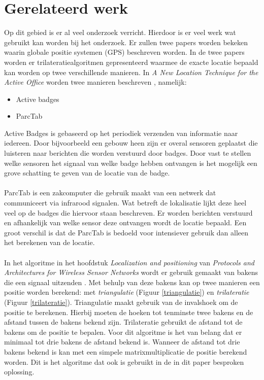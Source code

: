 \documentclass{article}
\begin{document}
\section{Gerelateerd werk}
Op dit gebied is er al veel onderzoek verricht. Hierdoor is er veel werk wat gebruikt kan worden bij het onderzoek. Er zullen twee papers worden bekeken waarin globale positie systemen (GPS) beschreven worden. In de twee papers worden er trilateratiealgoritmen gepresenteerd waarmee de exacte locatie bepaald kan worden op twee verschillende manieren. In \textit{A New Location Technique for the Active Office} worden twee manieren beschreven \cite{ward97}, namelijk:
\begin{itemize}
	\item Active badges
	\item ParcTab
\end{itemize}
Active Badges is gebaseerd op het periodiek verzenden van informatie naar iedereen. Door bijvoorbeeld een gebouw heen zijn er overal sensoren geplaatst die luisteren naar berichten die worden verstuurd door badges. Door vast te stellen welke sensoren het signaal van welke badge hebben ontvangen is het mogelijk een grove schatting te geven van de locatie van de badge.\\
\\
ParcTab is een zakcomputer die gebruik maakt van een netwerk dat communiceert via infrarood signalen. Wat betreft de lokalisatie lijkt deze heel veel op de badges die hiervoor staan beschreven. Er worden berichten verstuurd en afhankelijk van welke sensor deze ontvangen wordt de locatie bepaald. Een groot verschil is dat de ParcTab is bedoeld voor intensiever gebruik dan alleen het berekenen van de locatie. \\
\\
In het algoritme in het hoofdstuk \textit{Localization and positioning} van \textit{Protocols and Architectures for Wireless Sensor Networks} wordt er gebruik gemaakt van bakens die een signaal uitzenden \cite{h9}. Met behulp van deze bakens kan op twee manieren een positie worden berekend: met \emph{triangulatie} (Figuur \ref{triangulatie}) en \emph{trilateratie} (Figuur \ref{trilateratie}). Triangulatie maakt gebruik van de invalshoek om de positie te berekenen. Hierbij moeten de hoeken tot tenminste twee bakens en de afstand tussen de bakens bekend zijn. Trilateratie gebruikt de afstand tot de bakens om de positie te bepalen. Voor dit algoritme is het van belang dat er minimaal tot drie bakens de afstand bekend is. Wanneer de afstand tot drie bakens bekend is kan met een simpele matrixmultiplicatie de positie berekend worden. Dit is het algoritme dat ook is gebruikt in de in dit paper besproken oplossing.
\end{document}
